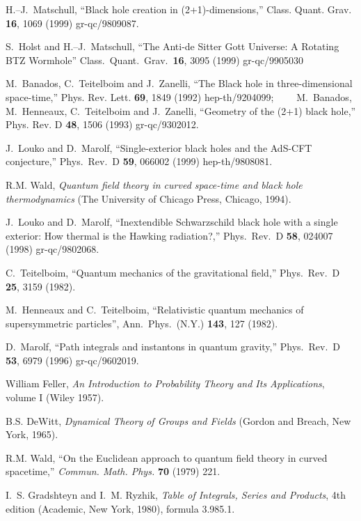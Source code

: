 \documentclass[a4paper,12pt]{article}
\begin{document}
\begin{thebibliography}{10}
H.--J.~Matschull, 
``Black hole creation in (2+1)-dimensions,''
Class. Quant. Grav. {\bf 16}, 1069 (1999)
gr-qc/9809087. 

S.~Holst 
and 
H.--J.~Matschull, 
``The Anti-de Sitter Gott Universe: A Rotating BTZ Wormhole'' 
Class.\ Quant.\ Grav.\  {\bf 16}, 3095 (1999)
gr-qc/9905030 

M.~Banados, C.~Teitelboim and J.~Zanelli, 
``The Black hole in three-dimensional space-time,'' 
Phys. Rev. Lett. {\bf 69}, 1849 (1992) 
hep-th/9204099;~~~~ 
M.~Banados, M.~Henneaux, C.~Teitelboim and J.~Zanelli, 
``Geometry of the (2+1) black hole,'' 
Phys. Rev. D {\bf 48}, 1506 (1993) 
gr-qc/9302012. 
 
J.~Louko and D.~Marolf,
``Single-exterior black holes and the AdS-CFT conjecture,''
Phys.\ Rev.\ D {\bf 59}, 066002 (1999)
hep-th/9808081.

 R.M. Wald, 
{\it Quantum field theory in curved space-time and
black hole thermodynamics\/} 
(The University of Chicago Press, Chicago, 1994).

J.~Louko and D.~Marolf,
``Inextendible Schwarzschild black hole with a single exterior: How
thermal is the Hawking radiation?,'' 
Phys.\ Rev.\ D {\bf 58}, 024007 (1998)
gr-qc/9802068. 

C.~Teitelboim, 
``Quantum mechanics of the gravitational field,''
Phys.\ Rev.\ D {\bf 25}, 3159 (1982).

 M.~Henneaux and C.~Teitelboim, ``Relativistic
  quantum mechanics of supersymmetric particles'', Ann.\ Phys.\ (N.Y.)
  {\bf 143}, 127 (1982).  

D.~Marolf, 
``Path integrals and instantons in quantum gravity,''
Phys.\ Rev.\ D {\bf 53}, 6979 (1996) 
gr-qc/9602019. 

William Feller,
{\it An Introduction to Probability Theory and Its Applications},
 volume I (Wiley 1957).

B.S. DeWitt, {\it Dynamical Theory of Groups and Fields}
(Gordon and Breach, New York, 1965).

R.M. Wald,  ``On the Euclidean approach to quantum field theory in
curved spacetime,'' {\it Commun. Math. Phys.} {\bf 70} (1979) 221.

  I.~S.  Gradshteyn and I.~M.  Ryzhik, {\it Table of Integrals, Series
    and Products}, 4th edition (Academic, New York, 1980), formula 
3.985.1.


\end{thebibliography} 
 
\end{document}

